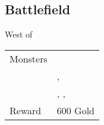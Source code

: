 \subsection{Battlefield}
\label{map:battlefield_09}

West of 

\noindent\begin{tabularx}{\textwidth}[l]{lX}
	Monsters
	& \nameref{monster:desert_hag} \\
	& \nameref{monster:desert_hag}, \nameref{monster:desert_hag} \\
	& \nameref{monster:desert_hag}, \nameref{monster:desert_hag}, \nameref{monster:desert_hag}
\\ \hline
	Reward & 600 Gold
\end{tabularx}
